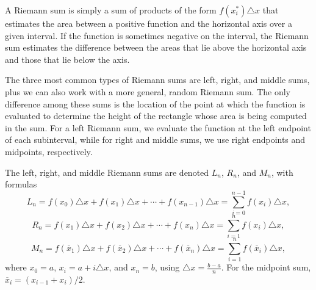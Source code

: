 \begin{summary}
\item A Riemann sum is simply a sum of products of the form $f(x_i^*) \triangle x$ that estimates the area between a positive function and the horizontal axis over a given interval.  If the function is sometimes negative on the interval, the Riemann sum estimates the difference between the areas that lie above the horizontal axis and those that lie below the axis.
\item The three most common types of Riemann sums are left, right, and middle sums, plus we can also work with a more general, random Riemann sum.  The only difference among these sums is the location of the point at which the function is evaluated to determine the height of the rectangle whose area is being computed in the sum.  For a left Riemann sum, we evaluate the function at the left endpoint of each subinterval, while for right and middle sums, we use right endpoints and midpoints, respectively.

\item The left, right, and middle Riemann sums are denoted $L_n$, $R_n$, and $M_n$, with formulas
\[ L_n = f(x_0) \triangle x + f(x_1) \triangle x + \cdots + f(x_{n-1}) \triangle x = \sum_{i = 0}^{n-1} f(x_i) \triangle x, \]
\[ R_n = f(x_1) \triangle x + f(x_2) \triangle x + \cdots + f(x_{n}) \triangle x = \sum_{i = 1}^{n} f(x_i) \triangle x,\]
\[ M_n = f(\overline{x}_1) \triangle x + f(\overline{x}_2) \triangle x + \cdots + f(\overline{x}_{n}) \triangle x = \sum_{i = 1}^{n} f(\overline{x}_i) \triangle x,\]
where $x_0 = a$, $x_i = a + i\triangle x$, and $x_n = b$, using $\triangle x = \frac{b-a}{n}$.  For the midpoint sum, $\overline{x}_{i} = (x_{i-1} + x_i)/2$.
\end{summary} 

\clearpage

 

\cleardoublepage